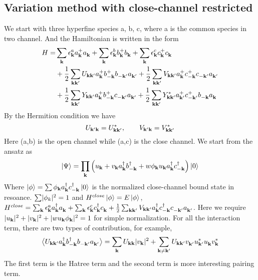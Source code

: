 \subsection{Variation method with close-channel restricted}

We start with three hyperfine species a, b, c, where a is the common species in two channel.  And the Hamiltonian is written in the form 
\begin{equation}\label{eq:091117:Hamiltonian}
\begin{split}
 H=&\sum_\vk\epsilon^a_\vk{}a^+_\vk{}a^{}_\vk+\sum_\vk\epsilon^b_\vk{}b^+_\vk{}b^{}_\vk+\sum_\vk\epsilon^c_\vk{}c^+_\vk{}c^{}_\vk\\
  &+\nth{2}\sum_{\vk\vk'}U_{\vk\vk'}a^+_\vk{}b^+_{-\vk}{}b^{}_{-\vk'}a^{}_{\vk'}
	+\nth{2}\sum_{\vk\vk'}V_{\vk\vk'}a^+_\vk{}c^+_{-\vk}{}c^{}_{-\vk'}a^{}_{\vk'}\\
 &+\nth{2}\sum_{\vk\vk'}Y_{\vk\vk'}a^+_\vk{}b^+_{-\vk}{}c^{}_{-\vk'}a^{}_{\vk'}
	+\nth{2}\sum_{\vk\vk'}Y^*_{\vk\vk'}a^+_{\vk'}{}c^+_{-\vk'}{}b^{}_{-\vk}a^{}_{\vk}
\end{split} 
\end{equation}
By the Hermition condition we have 
\begin{equation}
 U_{\vk'\vk}=U^*_{\vk\vk'},\qquad{} V_{\vk'\vk}=V^*_{\vk\vk'}
\end{equation}
Here (a,b) is the open channel while (a,c) is the close channel.  We start from the ansatz as 
\begin{equation}\label{eq:ansatz}
 \ket{\Psi}=\prod_\vk\br{u_\vk+v_\vk{}a^\dg_\vk{}b^\dg_{-\vk}+w\phi_\vk{}u_\vk{}a^\dg_\vk{}c^\dg_{-\vk}}\ket{0}
\end{equation}
Where $\ket{\phi}=\sum\phi_\vk{}a^\dg_\vk{}c^\dg_{-\vk}\ket{0}$ is the normalized close-channel bound state in resoance.  $\sum\abs{\phi_k}^2=1$ and $H^{close}\ket{\phi}=E\ket{\phi}$, $H^{close}=\sum_\vk\epsilon^a_\vk{}a^\dg_\vk{}a^{}_\vk+\sum_\vk\epsilon^c_\vk{}c^\dg_\vk{}c^{}_\vk+\nth{2}\sum_{\vk\vk'}V_{\vk\vk'}a^\dg_\vk{}c^\dg_{-\vk}{}c^{}_{-\vk'}a^{}_{\vk'}$.
Here we require $\abs{u_\vk}^2+\abs{v_\vk}^2+\abs{wu_\vk\phi_\vk}^2=1$ for simple normalization.  For all the interaction term, there are two types of contribution,
for example, 
\begin{equation*}
\av{U_{\vk\vk'}a^\dg_\vk{}b^\dg_{-\vk}{}b^{}_{-\vk'}a^{}_{\vk'}}
=\sum_{\vk}U_{\vk\vk}\abs{v_\vk}^2+\sum_{\vk\neq\vk'}U_{\vk\vk'}v^{}_{\vk'}u^*_{\vk'}u^{}_\vk{}v^*_\vk
\end{equation*}
The first term is the Hatree term and the second term is more interesting pairing term. 


